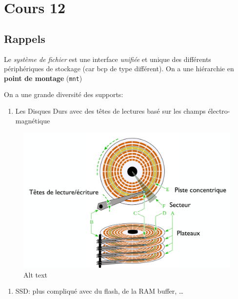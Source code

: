 \section{Cours 12}\label{cours-12}

\subsection{Rappels}\label{rappels}

Le \emph{système de fichier} est une interface \emph{unifiée} et unique
des différents périphériques de stockage (car bcp de type différent). On
a une hiérarchie en \textbf{point de montage} (\texttt{mnt})

On a une grande diversité des supports:

\begin{enumerate}
\def\labelenumi{\arabic{enumi}.}
\tightlist
\item
  Les Disques Durs avec des têtes de lectures basé sur les champs
  électro-magnétique
\end{enumerate}

\begin{figure}
\centering
\includegraphics{image-35.png}
\caption{Alt text}
\end{figure}

\begin{enumerate}
\def\labelenumi{\arabic{enumi}.}
\setcounter{enumi}{1}
\tightlist
\item
  SSD: plus compliqué avec du flash, de la RAM buffer, \ldots{}
\end{enumerate}

